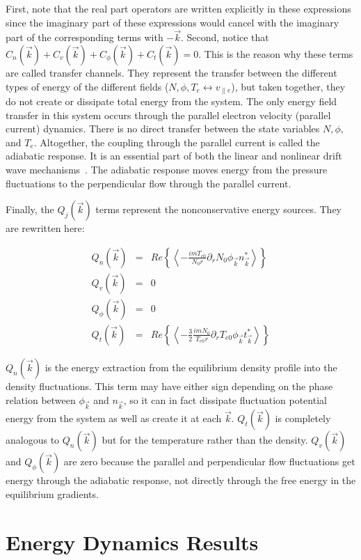 \documentclass[showpacs,preprintnumbers,amsmath,amssymb,superscriptaddress,aip]{revtex4-1}
\def\beqar{\begin{eqnarray}}
\def\eeqar{\end{eqnarray}}
\def\para{\parallel}
\newcommand{\pdr}{\partial_r}
\begin{document}
First, note that the real part operators are written explicitly in these expressions since the imaginary part of these expressions would cancel with the imaginary part of the 
corresponding terms with $-\vec{k}$. Second, notice that $C_n(\vec{k}) + C_v(\vec{k}) + C_\phi(\vec{k}) + C_t(\vec{k}) = 0$.
This is the reason why these terms are called transfer channels. They represent the transfer
between the different types of energy of the different fields ($N,\phi,T_e \leftrightarrow v_{\para e}$), but taken together, they do not create or dissipate total
energy from the system. The only energy field transfer in this system occurs through the parallel electron velocity (parallel current) dynamics. There is no direct transfer between
the state variables $N, \phi,$ and $T_e$.  Altogether, the coupling through the parallel current is called the
adiabatic response. It is an essential part of both the linear and nonlinear
drift wave mechanisms~\cite{scott2002,scott2005}. The adiabatic response moves energy from the pressure fluctuations to the perpendicular flow through the parallel current.

Finally, the $Q_j(\vec{k})$ terms represent the nonconservative energy sources. They are rewritten here:

\beqar
Q_n(\vec{k}) & = & Re \left\{ \left< -\frac{i m T_{e0}}{N_0 r} \pdr N_0 \phi_{\vec{k}} n_{\vec{k}}^*  \right> \right\}
\label{Qnk} \\
Q_v(\vec{k}) & = & 0
\label{Qvk} \\
Q_\phi(\vec{k}) & = & 0
\label{Qpk} \\
Q_t(\vec{k}) & = & Re \left\{ \left< -\frac{3}{2} \frac{i m N_0}{T_{e0} r} \pdr T_{e0} \phi_{\vec{k}} t_{\vec{k}}^*  \right> \right\}
\label{Qtk}
\eeqar

$Q_n(\vec{k})$ is the energy extraction from the equilibrium density profile into the density fluctuations. 
This term may have either sign depending on the phase relation between $\phi_{\vec{k}}$ and $n_{\vec{k}}$, 
so it can in fact dissipate fluctuation potential energy from the system as well as create it
at each $\vec{k}$. $Q_t(\vec{k})$ is completely analogous to $Q_n(\vec{k})$ but for the temperature rather than the density. 
$Q_v(\vec{k})$ and $Q_\phi(\vec{k})$ are zero because the parallel and perpendicular flow fluctuations get energy through the adiabatic response, not directly through the free
energy in the equilibrium gradients.


\section{Energy Dynamics Results}
\label{dyn_results}
\end{document}
